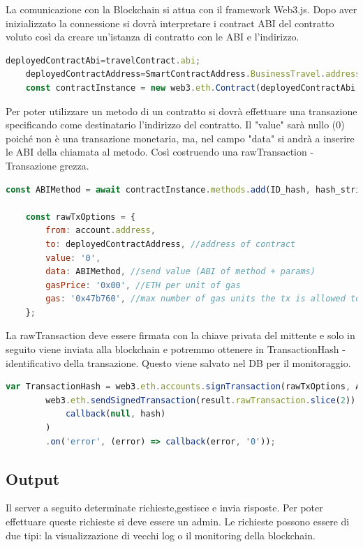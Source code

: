 \documentclass[11pt,a4paper,titlepage]{report}
\begin{document}
La comunicazione con la Blockchain si attua con il framework Web3.js. Dopo aver inizializzato la connessione si dovrà interpretare i contract ABI del contratto voluto così da creare un'istanza di contratto con le ABI e l'indirizzo.
 
\begin{lstlisting}[language=JavaScript]
	deployedContractAbi=travelContract.abi;
	deployedContractAddress=SmartContractAddress.BusinessTravel.address;
	const contractInstance = new web3.eth.Contract(deployedContractAbi, deployedContractAddress);
\end{lstlisting}

Per poter utilizzare un metodo di un contratto si dovrà effettuare una transazione specificando come destinatario l'indirizzo del contratto. Il "value" sarà nullo (0) poiché non è una transazione monetaria, ma, nel campo "data" si andrà a inserire le ABI della chiamata al metodo. Così costruendo una rawTransaction - Transazione grezza.
\begin{lstlisting}[language=JavaScript]
	const ABIMethod = await contractInstance.methods.add(ID_hash, hash_string.toString()).encodeABI();

	const rawTxOptions = {
	    from: account.address,
	    to: deployedContractAddress, //address of contract
	    value: '0',
	    data: ABIMethod, //send value (ABI of method + params)
	    gasPrice: '0x00', //ETH per unit of gas
	    gas: '0x47b760', //max number of gas units the tx is allowed to use
  	};
\end{lstlisting}
La rawTransaction deve essere firmata con la chiave privata del mittente e solo in seguito viene inviata alla blockchain
e potremmo ottenere in TransactionHash - identificativo della transazione. Questo viene salvato nel DB per il monitoraggio.
\begin{lstlisting}[language=JavaScript]
  	var TransactionHash = web3.eth.accounts.signTransaction(rawTxOptions, AccountPrivateKey).then(async function(result){ 
	    web3.eth.sendSignedTransaction(result.rawTransaction.slice(2)).on('transactionHash',(hash) => 
            callback(null, hash)
        )
        .on('error', (error) => callback(error, '0'));
\end{lstlisting}

\subsection{Output}
Il server a seguito determinate richieste,gestisce e invia risposte. Per poter effettuare queste richieste si deve essere un admin. Le richieste possono essere di due tipi: la visualizzazione di vecchi log o il monitoring della blockchain.
\end{document}
